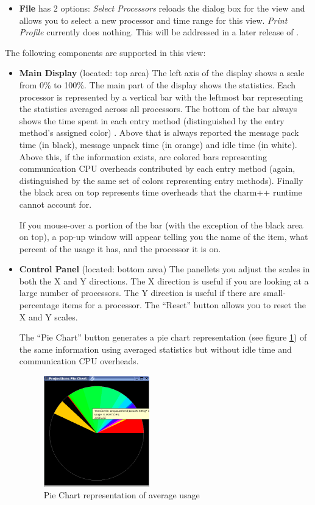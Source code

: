 \documentclass[10pt]{article}
\begin{document}
\begin{itemize}
\item {\bf File} has 2 options: {\it Select Processors} reloads the dialog
box for the view and allows you to select a new processor and time range
for this view. {\it Print Profile} currently does nothing. This will be
addressed in a later release of \projections{}.
\end{itemize}

The following components are supported in this view:

\begin{itemize}
\item[1)] 
{\bf Main Display} (located: top area) 
The left axis of the display shows a scale from 0\% to 100\%.  The
main part of the display shows the statistics.  Each processor is
represented by a vertical bar with the leftmost bar representing the
statistics averaged across all processors. The bottom of the bar
always shows the time spent in each entry method (distinguished by the
entry method's assigned color) . Above that is always reported the
message pack time (in black), message unpack time (in orange) and idle
time (in white). Above this, if the information exists, are colored
bars representing communication CPU overheads contributed by each
entry method (again, distinguished by the same set of colors
representing entry methods). Finally the black area on top represents
time overheads that the charm++ runtime cannot account for.

If you mouse-over a portion of the bar (with the exception of the
black area on top), a pop-up window will appear telling you the name
of the item, what percent of the usage it has, and the processor it is
on.

\item[2)]
{\bf Control Panel} (located: bottom area)
The panellets you adjust the scales in both the X and Y directions.
The X direction is useful if you are looking at a large number of
processors. The Y direction is useful if there are small-percentage
items for a processor. The ``Reset'' button allows you to reset the 
X and Y scales.

The ``Pie Chart'' button generates a pie chart representation (see
figure \ref{piechart}) of the same information using averaged
statistics but without idle time and communication CPU overheads.

\begin{figure}[htb]
\center
\includegraphics[width=1.8in]{fig/piechart}
\caption{Pie Chart representation of average usage}
\label{piechart}
\end{figure}


\end{itemize}
\end{document}
